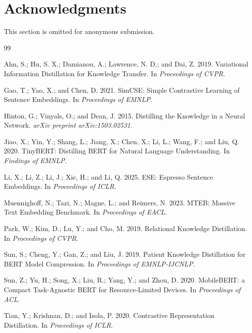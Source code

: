 \documentclass[letterpaper]{article}
\begin{document}
\section*{Acknowledgments}
This section is omitted for anonymous submission.

\begin{thebibliography}{99}

Ahn, S.; Hu, S. X.; Damianou, A.; Lawrence, N. D.; and Dai, Z. 2019.
Variational Information Distillation for Knowledge Transfer.
In \emph{Proceedings of CVPR}.

Gao, T.; Yao, X.; and Chen, D. 2021.
SimCSE: Simple Contrastive Learning of Sentence Embeddings.
In \emph{Proceedings of EMNLP}.

Hinton, G.; Vinyals, O.; and Dean, J. 2015.
Distilling the Knowledge in a Neural Network.
\emph{arXiv preprint arXiv:1503.02531}.

Jiao, X.; Yin, Y.; Shang, L.; Jiang, X.; Chen, X.; Li, L.; Wang, F.; and Liu, Q. 2020.
TinyBERT: Distilling BERT for Natural Language Understanding.
In \emph{Findings of EMNLP}.

Li, X.; Li, Z.; Li, J.; Xie, H.; and Li, Q. 2025.
ESE: Espresso Sentence Embeddings.
In \emph{Proceedings of ICLR}.

Muennighoff, N.; Tazi, N.; Magne, L.; and Reimers, N. 2023.
MTEB: Massive Text Embedding Benchmark.
In \emph{Proceedings of EACL}.

Park, W.; Kim, D.; Lu, Y.; and Cho, M. 2019.
Relational Knowledge Distillation.
In \emph{Proceedings of CVPR}.

Sun, S.; Cheng, Y.; Gan, Z.; and Liu, J. 2019.
Patient Knowledge Distillation for BERT Model Compression.
In \emph{Proceedings of EMNLP-IJCNLP}.

Sun, Z.; Yu, H.; Song, X.; Liu, R.; Yang, Y.; and Zhou, D. 2020.
MobileBERT: a Compact Task-Agnostic BERT for Resource-Limited Devices.
In \emph{Proceedings of ACL}.

Tian, Y.; Krishnan, D.; and Isola, P. 2020.
Contrastive Representation Distillation.
In \emph{Proceedings of ICLR}.


\end{thebibliography}
\end{document}
